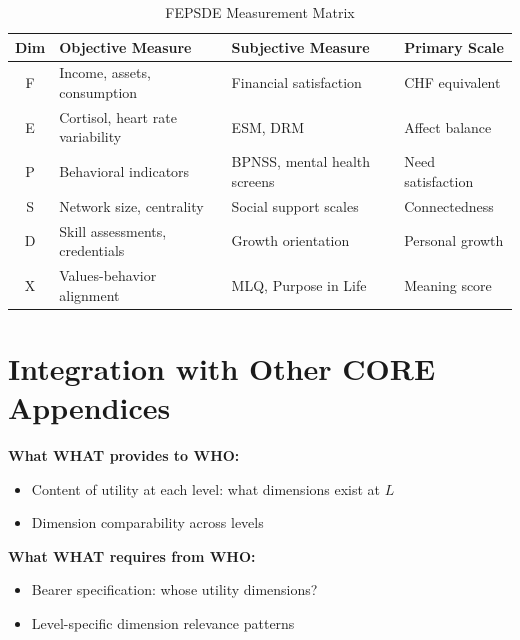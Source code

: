 \begin{table}[htbp]
\centering
\caption{FEPSDE Measurement Matrix}
\label{tab:what-measurement}
\renewcommand{\arraystretch}{1.3}
\begin{tabular}{@{}clll@{}}
\toprule
\textbf{Dim} & \textbf{Objective Measure} & \textbf{Subjective Measure} & \textbf{Primary Scale} \\
\midrule
F & Income, assets, consumption & Financial satisfaction & CHF equivalent \\
E & Cortisol, heart rate variability & ESM, DRM & Affect balance \\
P & Behavioral indicators & BPNSS, mental health screens & Need satisfaction \\
S & Network size, centrality & Social support scales & Connectedness \\
D & Skill assessments, credentials & Growth orientation & Personal growth \\
X & Values-behavior alignment & MLQ, Purpose in Life & Meaning score \\
\bottomrule
\end{tabular}
\end{table}


\section{Integration with Other CORE Appendices}
\label{sec:what-integration}

\begin{tcolorbox}[colback=yellow!5!white, colframe=yellow!75!black,
    title=Integration: CORE-WHAT $\leftrightarrow$ CORE-WHO]
\textbf{What WHAT provides to WHO:}
\begin{itemize}[nosep]
\item Content of utility at each level: what dimensions exist at $L$
\item Dimension comparability across levels
\end{itemize}

\textbf{What WHAT requires from WHO:}
\begin{itemize}[nosep]
\item Bearer specification: whose utility dimensions?
\item Level-specific dimension relevance patterns
\end{itemize}
\end{tcolorbox}


